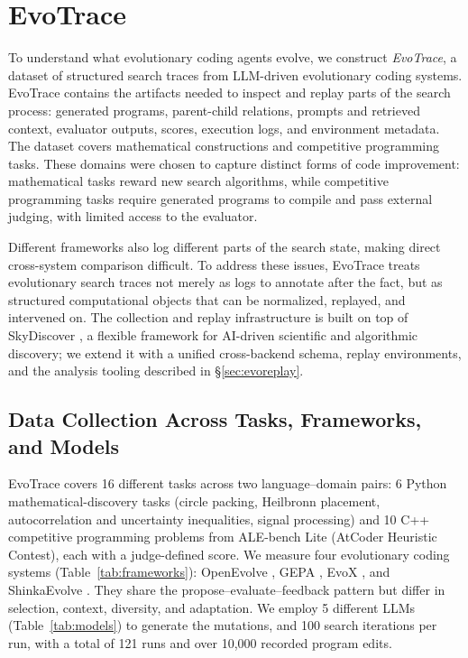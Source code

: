 \section{EvoTrace}
\label{sec:dataset}

To understand what evolutionary coding agents evolve, we construct \emph{EvoTrace}, a dataset of structured search traces from LLM-driven evolutionary coding systems.
EvoTrace contains the artifacts needed to inspect and replay parts of the search process: generated programs, parent-child relations, prompts and retrieved context, evaluator outputs, scores, execution logs, and environment metadata.
The dataset covers mathematical constructions and competitive programming tasks.
These domains were chosen to capture distinct forms of code improvement: mathematical tasks reward new search algorithms, while competitive programming tasks require generated programs to compile and pass external judging, with limited access to the evaluator.

Different frameworks also log different parts of the search state, making direct cross-system comparison difficult.
To address these issues, EvoTrace treats evolutionary search traces not merely as logs to annotate after the fact, but as structured computational objects that can be normalized, replayed, and intervened on. The collection and replay infrastructure is built on top of SkyDiscover \citep{skydiscover2026}, a flexible framework for AI-driven scientific and algorithmic discovery; we extend it with a unified cross-backend schema, replay environments, and the analysis tooling described in \S\ref{sec:evoreplay}.


\subsection{Data Collection Across Tasks, Frameworks, and Models}
\label{sec:dataset_collection}

EvoTrace covers 16 different tasks across two language--domain pairs: 6 Python mathematical-discovery tasks (circle packing, Heilbronn placement, autocorrelation and uncertainty inequalities, signal processing) and 10 C++ competitive programming problems from ALE-bench Lite \citep{imajuku2025} (AtCoder Heuristic Contest), each with a judge-defined score. We measure four evolutionary coding systems (Table~\ref{tab:frameworks}): OpenEvolve \citep{openevolve}, GEPA \citep{agrawal2026}, EvoX \citep{liu2026}, and ShinkaEvolve \citep{lange2025b}.
They share the propose--evaluate--feedback pattern but differ in selection, context, diversity, and adaptation. 
We employ 5 different LLMs (Table~\ref{tab:models}) to generate the mutations, and 100 search iterations per run, with a total of 121 runs and over 10,000 recorded program edits.


